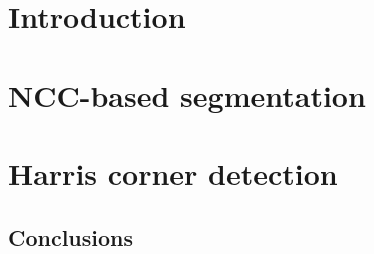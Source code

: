 \chapter*{Introduction}


\chapter{NCC-based segmentation}



\chapter{Harris corner detection}


\newpage
\section*{Conclusions}



